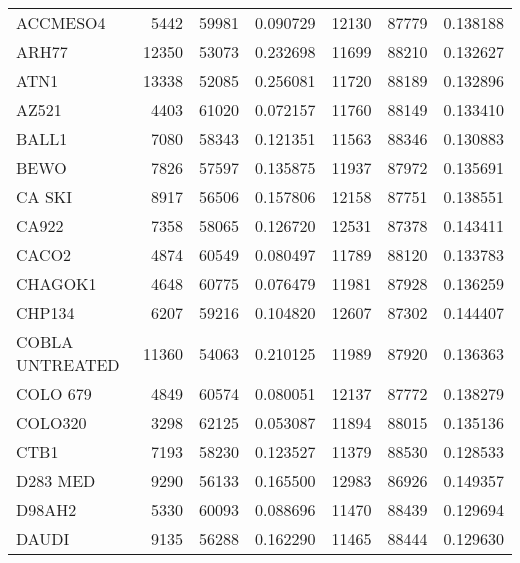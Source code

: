 \begin{tabular}{lrrrrrr}
                             ACCMESO4 &      5442 &    59981 &  0.090729 &     12130 &    87779 &  0.138188 \\
                                ARH77 &     12350 &    53073 &  0.232698 &     11699 &    88210 &  0.132627 \\
                                 ATN1 &     13338 &    52085 &  0.256081 &     11720 &    88189 &  0.132896 \\
                                AZ521 &      4403 &    61020 &  0.072157 &     11760 &    88149 &  0.133410 \\
                                BALL1 &      7080 &    58343 &  0.121351 &     11563 &    88346 &  0.130883 \\
                                 BEWO &      7826 &    57597 &  0.135875 &     11937 &    87972 &  0.135691 \\
                               CA SKI &      8917 &    56506 &  0.157806 &     12158 &    87751 &  0.138551 \\
                                CA922 &      7358 &    58065 &  0.126720 &     12531 &    87378 &  0.143411 \\
                                CACO2 &      4874 &    60549 &  0.080497 &     11789 &    88120 &  0.133783 \\
                              CHAGOK1 &      4648 &    60775 &  0.076479 &     11981 &    87928 &  0.136259 \\
                               CHP134 &      6207 &    59216 &  0.104820 &     12607 &    87302 &  0.144407 \\
                      COBLA UNTREATED &     11360 &    54063 &  0.210125 &     11989 &    87920 &  0.136363 \\
                             COLO 679 &      4849 &    60574 &  0.080051 &     12137 &    87772 &  0.138279 \\
                              COLO320 &      3298 &    62125 &  0.053087 &     11894 &    88015 &  0.135136 \\
                                 CTB1 &      7193 &    58230 &  0.123527 &     11379 &    88530 &  0.128533 \\
                             D283 MED &      9290 &    56133 &  0.165500 &     12983 &    86926 &  0.149357 \\
                               D98AH2 &      5330 &    60093 &  0.088696 &     11470 &    88439 &  0.129694 \\
                                DAUDI &      9135 &    56288 &  0.162290 &     11465 &    88444 &  0.129630 \\

\end{tabular}
